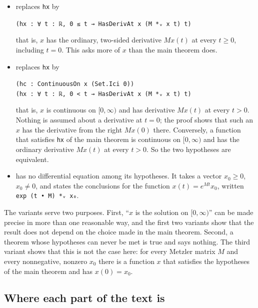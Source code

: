 \documentclass[11pt]{article}
\theoremstyle{definition}
\theoremstyle{remark}
\begin{document}
\begin{itemize}[leftmargin=2em]
  \item {} replaces \verb|hx| by
        \begin{center}
        \verb|(hx : ∀ t : ℝ, 0 ≤ t → HasDerivAt x (M *ᵥ x t) t)|
        \end{center}
        that is, $x$ has the ordinary, two-sided derivative $M x(t)$ at every $t \ge 0$, including
        $t = 0$. This asks more of $x$ than the main theorem does.
  \item {} replaces \verb|hx| by
        \begin{center}
        \verb|(hc : ContinuousOn x (Set.Ici 0))| \\
        \verb|(hx : ∀ t : ℝ, 0 < t → HasDerivAt x (M *ᵥ x t) t)|
        \end{center}
        that is, $x$ is continuous on $[0, \infty)$ and has derivative $M x(t)$ at every $t > 0$.
        Nothing is assumed about a derivative at $t = 0$; the proof shows that such an $x$ has
        the derivative from the right $M x(0)$ there. Conversely, a function that satisfies
        \verb|hx| of the main theorem is continuous on $[0, \infty)$ and has the ordinary
        derivative $M x(t)$ at every $t > 0$. So the two hypotheses are equivalent.
  \item {} has no differential equation among its hypotheses.
        It takes a vector $x_0 \ge 0$, $x_0 \ne 0$, and states the conclusions for the function
        $x(t) = e^{Mt} x_0$, written \verb|exp (t • M) *ᵥ x₀|.
\end{itemize}

The variants serve two purposes. First, ``$x$ is the solution on $[0, \infty)$'' can be made
precise in more than one reasonable way, and the first two variants show that the result does not
depend on the choice made in the main theorem. Second, a theorem whose hypotheses can never be
met is true and says nothing. The third variant shows that this is not the case here: for every
Metzler matrix $M$ and every nonnegative, nonzero $x_0$ there is a function $x$ that satisfies
the hypotheses of the main theorem and has $x(0) = x_0$.

\subsection{Where each part of the text is}\label{sec:lean:map}
\end{document}
